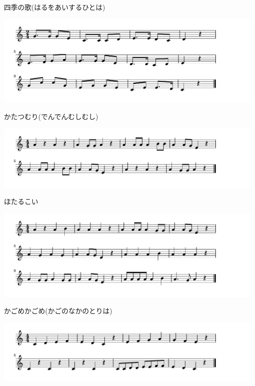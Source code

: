 \documentclass[a4paper]{ltjsarticle}
\begin{document}
\vspace{-10mm} \hspace{10mm}
四季の歌(はるをあいするひとは)

\includegraphics[clip]{katatsumuri_crop.pdf}

\vspace{-10mm} \hspace{10mm}
かたつむり(でんでんむしむし)

\includegraphics[clip]{hotarukoi_crop.pdf}

\vspace{-10mm} \hspace{10mm}
ほたるこい

\includegraphics[clip]{kagome_crop.pdf}

\vspace{-10mm} \hspace{10mm}
かごめかごめ(かごのなかのとりは)

\includegraphics[clip]{kaerunogassho_crop.pdf}
\end{document}

